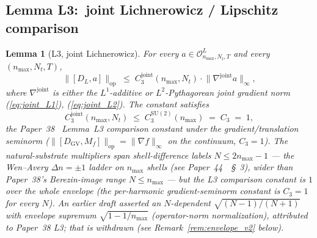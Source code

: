\documentclass[11pt,a4paper]{article}
\theoremstyle{plain}
\newtheorem{lemma}[theorem]{Lemma}
\theoremstyle{definition}
\newcommand{\nmax}{n_{\max}}
\newcommand{\Nt}{N_{t}}
\newcommand{\Op}{\mathcal{O}}
\newcommand{\opnorm}[1]{\lVert #1 \rVert_{\mathrm{op}}}
\newcommand{\norm}[1]{\lVert #1 \rVert}
\newcommand{\SU}{\mathrm{SU}}
\newcommand{\DGV}{D_{\mathrm{GV}}}
\newcommand{\DL}{D_{L}}
\newcommand{\Cthreejoint}{C_{3}^{\mathrm{joint}}}
\newcommand{\CthreeSU}{C_{3}^{\SU(2)}}
\begin{document}
\subsection{Lemma L3:\ joint Lichnerowicz / Lipschitz comparison}
\label{sec:L3}

\begin{lemma}[L3, joint Lichnerowicz]\label{lem:L3}
For every $a \in \Op^{L}_{\nmax,\Nt,T}$ and every $(\nmax, \Nt, T)$,
\begin{equation}\label{eq:L3_main}
   \opnorm{[\DL, a]}
   \;\le\; \Cthreejoint(\nmax, \Nt) \cdot \norm{\nabla^{\mathrm{joint}} a}_{\infty},
\end{equation}
where $\nabla^{\mathrm{joint}}$ is either the $L^{1}$-additive or
$L^{2}$-Pythagorean joint gradient norm (\ref{eq:joint_L1}),
(\ref{eq:joint_L2}). The constant satisfies
\begin{equation}\label{eq:C3_joint_bound}
   \Cthreejoint(\nmax, \Nt)
   \;\le\; \CthreeSU(\nmax)
   \;=\; C_{3} \;=\; 1,
\end{equation}
the Paper~38~\cite{paper38} Lemma~L3 comparison constant under the
gradient/translation seminorm ($\opnorm{[\DGV, M_{f}]} = \norm{\nabla f}_{\infty}$
on the continuum, $C_{3} = 1$). The natural-substrate multipliers span
shell-difference labels $N \le 2\nmax - 1$ — the Wen--Avery
$\Delta n = \pm 1$ ladder on $\nmax$ shells (see Paper~44~\cite{paper44}~\S~3),
wider than Paper~38's Berezin-image range $N \le \nmax$ — but the L3
comparison constant is $1$ over the whole envelope (the per-harmonic
gradient-seminorm constant is $C_{3} = 1$ for every $N$). An earlier draft
asserted an $N$-dependent $\sqrt{(N-1)/(N+1)}$ with envelope supremum
$\sqrt{1 - 1/\nmax}$ (operator-norm normalization), attributed to Paper~38
L3; that is withdrawn (see Remark~\ref{rem:envelope_v2} below).
\end{lemma}
\end{document}
